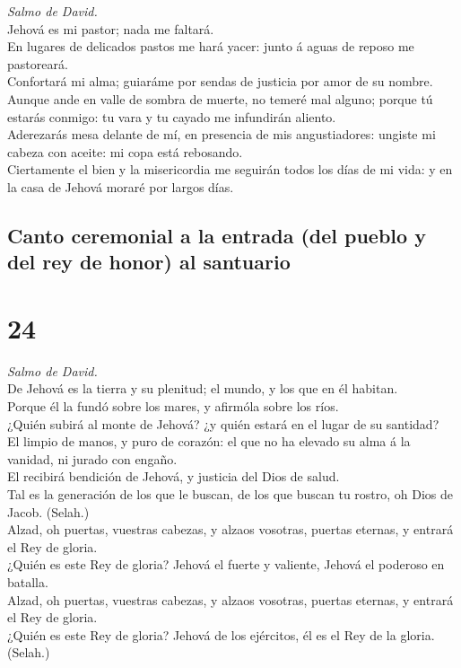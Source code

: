 \emph{Salmo de David.}\\
Jehová es mi pastor; nada me faltará.\\
 En lugares de delicados pastos me hará yacer: junto á aguas
de reposo me pastoreará.\\
 Confortará mi alma; guiaráme por sendas de justicia por
amor de su nombre.\\
 Aunque ande en valle de sombra de muerte, no temeré mal
alguno; porque tú estarás conmigo: tu vara y tu cayado me infundirán
aliento.\\
 Aderezarás mesa delante de mí, en presencia de mis
angustiadores: ungiste mi cabeza con aceite: mi copa está rebosando.\\
 Ciertamente el bien y la misericordia me seguirán todos los
días de mi vida: y en la casa de Jehová moraré por largos días.

\hypertarget{canto-ceremonial-a-la-entrada-del-pueblo-y-del-rey-de-honor-al-santuario}{%
\subsection{Canto ceremonial a la entrada (del pueblo y del rey de
honor) al
santuario}\label{canto-ceremonial-a-la-entrada-del-pueblo-y-del-rey-de-honor-al-santuario}}

\hypertarget{section-23}{%
\section{24}\label{section-23}}

 \emph{Salmo de David.}\\
De Jehová es la tierra y su plenitud; el mundo, y los que en él
habitan.\\
 Porque él la fundó sobre los mares, y afirmóla sobre los
ríos.\\
 ¿Quién subirá al monte de Jehová? ¿y quién estará en el
lugar de su santidad?\\
 El limpio de manos, y puro de corazón: el que no ha elevado
su alma á la vanidad, ni jurado con engaño.\\
 El recibirá bendición de Jehová, y justicia del Dios de
salud.\\
 Tal es la generación de los que le buscan, de los que
buscan tu rostro, oh Dios de Jacob. (Selah.)\\
 Alzad, oh puertas, vuestras cabezas, y alzaos vosotras,
puertas eternas, y entrará el Rey de gloria.\\
 ¿Quién es este Rey de gloria? Jehová el fuerte y valiente,
Jehová el poderoso en batalla.\\
 Alzad, oh puertas, vuestras cabezas, y alzaos vosotras,
puertas eternas, y entrará el Rey de gloria.\\
 ¿Quién es este Rey de gloria? Jehová de los ejércitos, él
es el Rey de la gloria. (Selah.)

